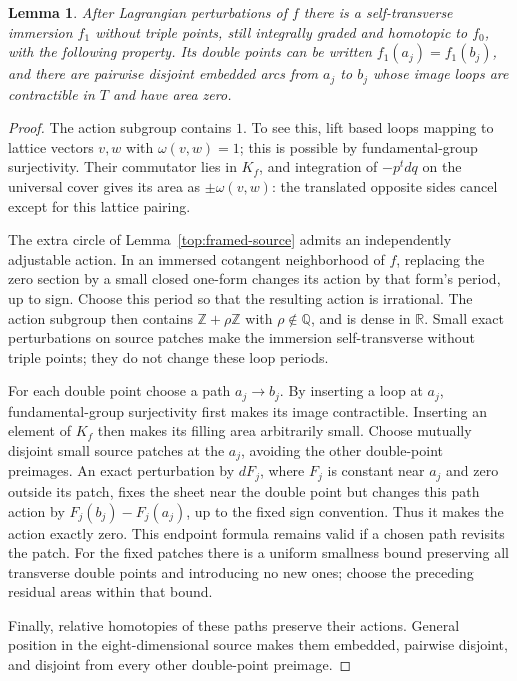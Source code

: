 \documentclass[11pt]{article}
\newtheorem{lemma}[theorem]{Lemma}
\theoremstyle{definition}
\theoremstyle{remark}
\newcommand{\Q}{\mathbb Q}
\newcommand{\R}{\mathbb R}
\newcommand{\Z}{\mathbb Z}
\numberwithin{equation}{section}
\begin{document}
\begin{lemma}\label{top:zero-actions}
After Lagrangian perturbations of $f$ there is a self-transverse
immersion $f_1$ without triple points, still integrally graded and
homotopic to $f_0$, with the following property.  Its double points
can be written $f_1(a_j)=f_1(b_j)$, and there are pairwise disjoint
embedded arcs from $a_j$ to $b_j$ whose image loops are contractible
in $T$ and have area zero.
\end{lemma}

\begin{proof}
The action subgroup contains $1$.  To see this, lift based loops
mapping to lattice vectors $v,w$ with $\omega(v,w)=1$; this is
possible by fundamental-group surjectivity.  Their commutator lies
in $K_f$, and integration of $-p^t dq$ on the universal cover gives
its area as $\pm\omega(v,w)$: the translated opposite sides cancel
except for this lattice pairing.

The extra circle of Lemma~\ref{top:framed-source} admits an
independently adjustable action.  In an immersed cotangent
neighborhood of $f$, replacing the zero section by a small closed
one-form changes its action by that form's period, up to sign.
Choose this period so that the resulting action is irrational.
The action subgroup then contains $\Z+\rho\Z$ with
$\rho\notin\Q$, and is dense in $\R$.  Small exact perturbations
on source patches make the immersion self-transverse without triple
points; they do not change these loop periods.

For each double point choose a path $a_j\to b_j$.  By inserting a
loop at $a_j$, fundamental-group surjectivity first makes its image
contractible.  Inserting an element of $K_f$ then makes its filling
area arbitrarily small.  Choose mutually disjoint small source
patches at the $a_j$, avoiding the other double-point preimages.
An exact perturbation by $dF_j$, where $F_j$ is constant near $a_j$
and zero outside its patch, fixes the sheet near the double point
but changes this path action by $F_j(b_j)-F_j(a_j)$, up to the
fixed sign convention.  Thus it makes the action exactly zero.
This endpoint formula remains valid if a chosen path revisits the
patch.  For the fixed patches there is a uniform smallness bound
preserving all transverse double points and introducing no new
ones; choose the preceding residual areas within that bound.

Finally, relative homotopies of these paths preserve their actions.
General position in the eight-dimensional source makes them
embedded, pairwise disjoint, and disjoint from every other
double-point preimage.
\end{proof}
\end{document}
